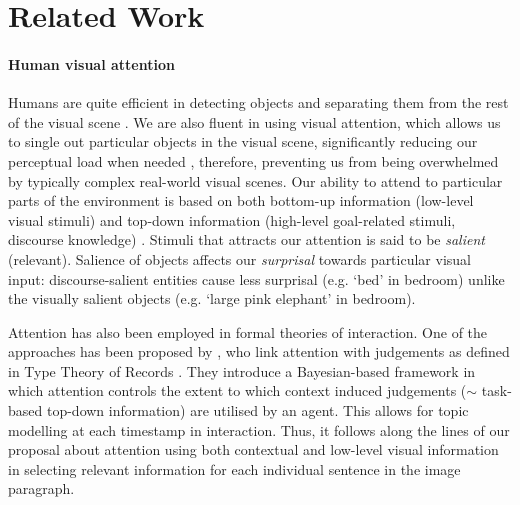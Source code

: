 \documentclass[11pt,a4paper]{article}
\begin{document}

\section{Related Work}

\iffalse
\paragraph{Human visual attention}
Humans are quite efficient in detecting objects and separating them from the rest of the visual scene \cite{Ullman87}.
We are also fluent in using visual attention, which allows us to single out particular objects in the visual scene, significantly reducing our perceptual load when needed \cite{Lavie04}, therefore, preventing us from being overwhelmed by typically complex real-world visual scenes.
Our ability to attend to particular parts of the environment is based on both bottom-up information (low-level visual stimuli) and top-down information (high-level goal-related stimuli, discourse knowledge) \cite{Zarcone2016}. %
Stimuli that attracts our attention is said to be \textit{salient} (relevant). Salience of objects affects our \textit{surprisal} towards particular visual input: discourse-salient entities cause less surprisal (e.g. `bed' in bedroom) unlike the visually salient objects (e.g. `large pink elephant' in bedroom).

Attention has also been employed in formal theories of interaction. One of the approaches has been proposed by , who link attention with
judgements as defined in Type Theory of Records \cite{Cooper08typetheory}.
They introduce a Bayesian-based framework in which attention controls the extent to which context induced judgements ($\sim$ task-based top-down information) are utilised by an agent. This allows for topic modelling at each timestamp in interaction. Thus, it follows along the lines of our proposal about attention using both contextual and low-level visual information in selecting relevant information for each individual sentence in the image paragraph.
\end{document}

